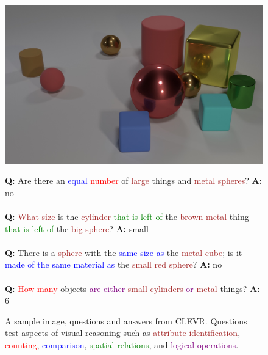 \begin{figure}[ht]
  \centering
  \begin{minipage}{0.49\textwidth}
  \includegraphics[width=\textwidth]{images/datasets/clevr_example.jpg}
  \end{minipage}
  \vspace{1mm}
  \begin{minipage}{0.49\textwidth}
    \footnotesize
    \textbf{Q:} Are there an \textcolor{blue}{equal} \textcolor{red}{number} of
    \textcolor{brown}{large} things and \textcolor{brown}{metal spheres}? \textbf{A:} no \\\\
    \textbf{Q:} \textcolor{brown}{What size} is the \textcolor{brown}{cylinder}
    \textcolor{green}{that is left of} the \textcolor{brown}{brown metal} thing
    \textcolor{green}{that is left of} the \textcolor{brown}{big sphere}? \textbf{A:} small \\\\
    \textbf{Q:} There is a \textcolor{brown}{sphere} with the \textcolor{blue}{same size as}
    the \textcolor{brown}{metal cube}; is it
    \textcolor{blue}{made of the same material as} the \textcolor{brown}{small red sphere}? \textbf{A:} no \\\\
    \textbf{Q:} \textcolor{red}{How many} objects \textcolor{purple}{are either}
    \textcolor{brown}{small cylinders}
    \textcolor{purple}{or} \textcolor{brown}{metal} things? \textbf{A:} 6
  \end{minipage}
  \vspace{1mm}
  \caption{A sample image, questions and answers from CLEVR. Questions test aspects of visual reasoning
    such as \textcolor{brown}{attribute identification}, \textcolor{red}{counting},
    \textcolor{blue}{comparison}, \textcolor{green}{spatial relations},
    and \textcolor{purple}{logical operations}.
  }
  \vspace{-4mm}
  \label{fig:clevr_example}
\end{figure}

